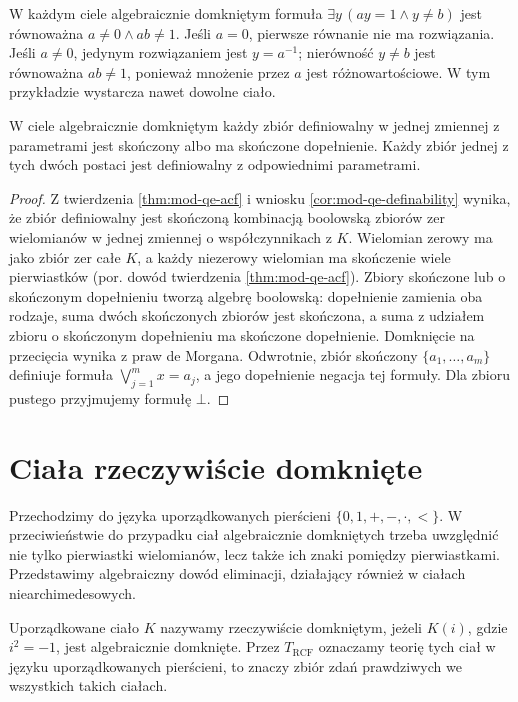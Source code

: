 \begin{przyklad}
\label{ex:mod-qe-acf-example}
W każdym ciele algebraicznie domkniętym formuła
$\exists y\,(ay=1\land y\ne b)$ jest równoważna
$a\ne0\land ab\ne1$.
Jeśli $a=0$, pierwsze równanie nie ma rozwiązania.
Jeśli $a\ne0$, jedynym rozwiązaniem jest $y=a^{-1}$;
nierówność $y\ne b$ jest równoważna $ab\ne1$,
ponieważ mnożenie przez $a$ jest różnowartościowe.
W tym przykładzie wystarcza nawet dowolne ciało.
\end{przyklad}

\begin{wniosek}
\label{cor:mod-qe-acf-one-variable}
W ciele algebraicznie domkniętym każdy zbiór definiowalny
w jednej zmiennej z parametrami jest skończony albo ma
skończone dopełnienie. Każdy zbiór jednej z tych dwóch
postaci jest definiowalny z odpowiednimi parametrami.
\end{wniosek}
\begin{proof}
Z twierdzenia \ref{thm:mod-qe-acf} i wniosku
\ref{cor:mod-qe-definability} wynika, że zbiór
definiowalny jest skończoną kombinacją boolowską zbiorów
zer wielomianów w jednej zmiennej o współczynnikach z $K$.
Wielomian zerowy ma jako zbiór zer całe $K$,
a każdy niezerowy wielomian ma skończenie wiele
pierwiastków (por. dowód twierdzenia \ref{thm:mod-qe-acf}).
Zbiory skończone lub o skończonym dopełnieniu tworzą
algebrę boolowską: dopełnienie zamienia oba rodzaje,
suma dwóch skończonych zbiorów jest skończona,
a suma z udziałem zbioru o skończonym dopełnieniu
ma skończone dopełnienie. Domknięcie na przecięcia
wynika z praw de Morgana.
Odwrotnie, zbiór skończony $\{a_1,\ldots,a_m\}$
definiuje formuła $\bigvee_{j=1}^m x=a_j$,
a jego dopełnienie negacja tej formuły.
Dla zbioru pustego przyjmujemy formułę $\bot$.
\end{proof}

\section{Ciała rzeczywiście domknięte}
Przechodzimy do języka uporządkowanych pierścieni
$\{0,1,+,-,\cdot,<\}$. W przeciwieństwie do przypadku ciał
algebraicznie domkniętych trzeba uwzględnić nie tylko
pierwiastki wielomianów, lecz także ich znaki pomiędzy
pierwiastkami. Przedstawimy algebraiczny dowód eliminacji,
działający również w ciałach niearchimedesowych.

\begin{definicja}
\label{def:mod-qe-rcf}
Uporządkowane ciało $K$ nazywamy rzeczywiście domkniętym,
jeżeli $K(i)$, gdzie $i^2=-1$, jest algebraicznie domknięte.
Przez $T_{\mathrm{RCF}}$ oznaczamy teorię tych ciał
w języku uporządkowanych pierścieni, to znaczy zbiór
zdań prawdziwych we wszystkich takich ciałach.
\end{definicja}


